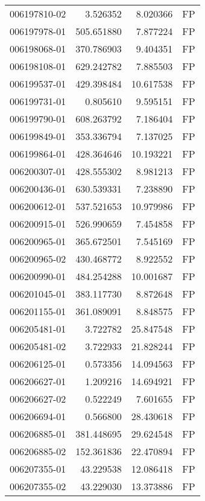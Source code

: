 \begin{tabular}{lrrl}
006197810-02 &    3.526352 &       8.020366 &   FP \\
006197978-01 &  505.651880 &       7.877224 &   FP \\
006198068-01 &  370.786903 &       9.404351 &   FP \\
006198108-01 &  629.242782 &       7.885503 &   FP \\
006199537-01 &  429.398484 &      10.617538 &   FP \\
006199731-01 &    0.805610 &       9.595151 &   FP \\
006199790-01 &  608.263792 &       7.186404 &   FP \\
006199849-01 &  353.336794 &       7.137025 &   FP \\
006199864-01 &  428.364646 &      10.193221 &   FP \\
006200307-01 &  428.555302 &       8.981213 &   FP \\
006200436-01 &  630.539331 &       7.238890 &   FP \\
006200612-01 &  537.521653 &      10.979986 &   FP \\
006200915-01 &  526.990659 &       7.454858 &   FP \\
006200965-01 &  365.672501 &       7.545169 &   FP \\
006200965-02 &  430.468772 &       8.922552 &   FP \\
006200990-01 &  484.254288 &      10.001687 &   FP \\
006201045-01 &  383.117730 &       8.872648 &   FP \\
006201155-01 &  361.089091 &       8.848575 &   FP \\
006205481-01 &    3.722782 &      25.847548 &   FP \\
006205481-02 &    3.722933 &      21.828244 &   FP \\
006206125-01 &    0.573356 &      14.094563 &   FP \\
006206627-01 &    1.209216 &      14.694921 &   FP \\
006206627-02 &    0.522249 &       7.601655 &   FP \\
006206694-01 &    0.566800 &      28.430618 &   FP \\
006206885-01 &  381.448695 &      29.624548 &   FP \\
006206885-02 &  152.361836 &      22.470894 &   FP \\
006207355-01 &   43.229538 &      12.086418 &   FP \\
006207355-02 &   43.229030 &      13.373886 &   FP \\

\end{tabular}

